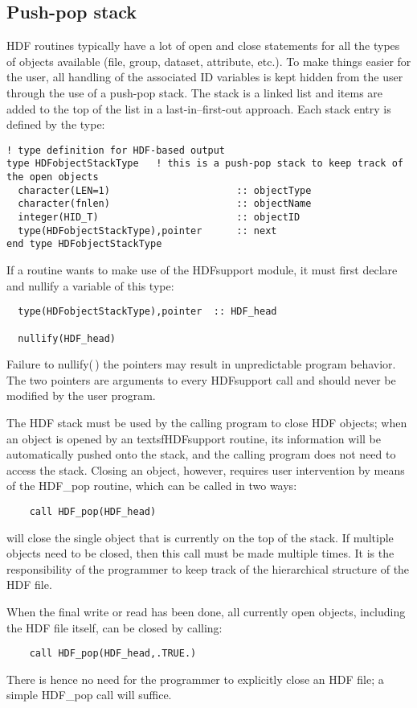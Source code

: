 \documentclass[DIV=calc, paper=letter, fontsize=11pt]{scrartcl}	 %
\begin{document}
\subsection{Push-pop stack}
HDF routines typically have a lot of \textsf{open} and \textsf{close} statements for all the types 
of objects available (file, group, dataset, attribute, etc.).  To make things easier for the user, 
all handling of the associated ID variables is kept hidden from the user through the use of a push-pop
stack.  The stack is a linked list and items are added to the top of the list in a \textsf{last-in--first-out}
approach.  Each stack entry is defined by the type:
\begin{verbatim}
! type definition for HDF-based output
type HDFobjectStackType   ! this is a push-pop stack to keep track of the open objects
  character(LEN=1)						:: objectType
  character(fnlen)						:: objectName
  integer(HID_T) 						:: objectID
  type(HDFobjectStackType),pointer		:: next
end type HDFobjectStackType
\end{verbatim}
If a routine wants to make use of the \textsf{HDFsupport} module, it must first declare
and nullify a variable of this type:
\begin{verbatim}
  type(HDFobjectStackType),pointer  :: HDF_head

  nullify(HDF_head)
\end{verbatim}
Failure to \textsf{nullify(\,)} the pointers may result in unpredictable program behavior.  The two 
pointers are arguments to every \textsf{HDFsupport} call and should never be modified by the user 
program. 

The HDF stack must be used by the calling program to close HDF objects; when an object is opened 
by an textsf{HDFsupport} routine, its information will be automatically pushed onto the stack, and the 
calling program does not need to access the stack.  Closing an object, however, requires user intervention
by means of the \textsf{HDF\_pop} routine, which can be called in two ways:
\begin{verbatim}
	call HDF_pop(HDF_head)
\end{verbatim}
will close the single object that is currently on the top of the stack. If multiple objects need to
be closed, then this call must be made multiple times.  It is the responsibility of the programmer to 
keep track of the hierarchical structure of the HDF file.

When the final write or read has been done, all currently open objects, including the HDF file itself, can
be closed by calling:
\begin{verbatim}
	call HDF_pop(HDF_head,.TRUE.)
\end{verbatim}
There is hence no need for the programmer to explicitly close an HDF file; a simple \textsf{HDF\_pop} call
will suffice.
\end{document}

